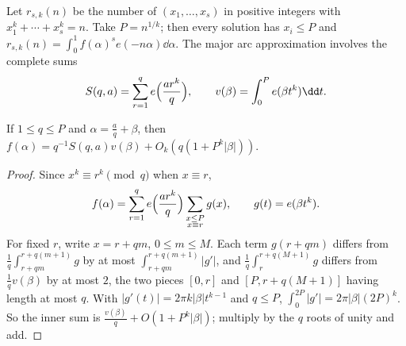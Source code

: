 Let $r_{s,k}(n)$ be the number of $(x_1,\dots,x_s)$ in positive integers with $x_1^k+\cdots+x_s^k=n$. Take $P=n^{1/k}$; then every solution has $x_i\le P$ and $r_{s,k}(n)=\int_0^1f(\alpha)^se(-n\alpha)\dd\alpha$. The major arc approximation involves the complete sums
\[
S(q,a)=\sum_{r=1}^qe\Bigl(\frac{ar^k}q\Bigr),\qquad v(\beta)=\int_0^Pe(\beta t^k)\dd t.
\]

\begin{lemma}\label{lem:waringmajor}
If $1\le q\le P$ and $\alpha=\frac aq+\beta$, then $f(\alpha)=q^{-1}S(q,a)v(\beta)+O_k(q(1+P^k|\beta|))$.
\end{lemma}
\begin{proof}
Since $x^k\equiv r^k\pmod q$ when $x\equiv r$,
\[
f(\alpha)=\sum_{r=1}^qe\Bigl(\frac{ar^k}q\Bigr)\sum_{\substack{x\le P\\x\equiv r}}g(x),\qquad g(t)=e(\beta t^k).
\]
 For fixed $r$, write $x=r+qm$, $0\le m\le M$. Each term $g(r+qm)$ differs from $\frac1q\int_{r+qm}^{r+q(m+1)}g$ by at most $\int_{r+qm}^{r+q(m+1)}|g'|$, and $\frac1q\int_{r}^{r+q(M+1)}g$ differs from $\frac1qv(\beta)$ by at most $2$, the two pieces $[0,r]$ and $[P,r+q(M+1)]$ having length at most $q$. With $|g'(t)|=2\pi k|\beta|t^{k-1}$ and $q\le P$, $\int_0^{2P}|g'|=2\pi|\beta|(2P)^k$. So the inner sum is $\frac{v(\beta)}q+O(1+P^k|\beta|)$; multiply by the $q$ roots of unity and add.
\end{proof}

